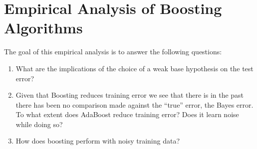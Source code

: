 \documentclass[letterpaper,11pt]{article}
\begin{document}
\noindent
\section{Empirical Analysis of Boosting Algorithms}
The goal of this empirical analysis is to answer the following questions: 
\begin{enumerate}
\item	What are the implications of the choice of a weak base hypothesis on the test error?
\item	Given that Boosting reduces training error we see that there is in the past there has been no comparison made against the “true” error, the Bayes error. To what extent does AdaBoost reduce training error? Does it learn noise while doing so?
\item 	How does boosting perform with noisy training data?
\end{enumerate}
\end{document}
